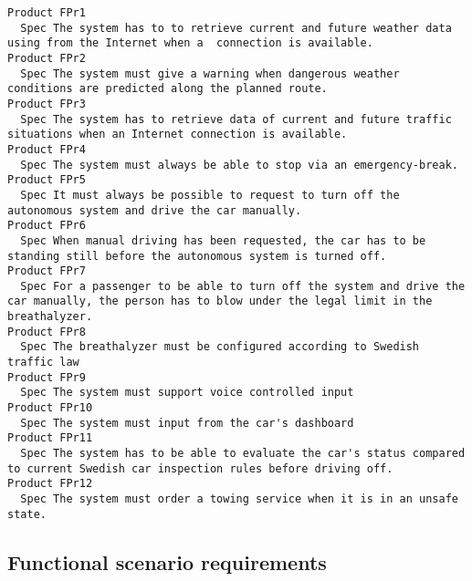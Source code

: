 \begin{lstlisting}
Product FPr1
  Spec The system has to to retrieve current and future weather data using from the Internet when a  connection is available.
Product FPr2
  Spec The system must give a warning when dangerous weather conditions are predicted along the planned route.
Product FPr3
  Spec The system has to retrieve data of current and future traffic situations when an Internet connection is available.
Product FPr4
  Spec The system must always be able to stop via an emergency-break.
Product FPr5
  Spec It must always be possible to request to turn off the autonomous system and drive the car manually.
Product FPr6
  Spec When manual driving has been requested, the car has to be standing still before the autonomous system is turned off.
Product FPr7
  Spec For a passenger to be able to turn off the system and drive the car manually, the person has to blow under the legal limit in the breathalyzer.
Product FPr8
  Spec The breathalyzer must be configured according to Swedish traffic law
Product FPr9
  Spec The system must support voice controlled input
Product FPr10
  Spec The system must input from the car's dashboard
Product FPr11
  Spec The system has to be able to evaluate the car's status compared to current Swedish car inspection rules before driving off.
Product FPr12
  Spec The system must order a towing service when it is in an unsafe state.

\end{lstlisting}
    
        
       \subsection{Functional scenario requirements}



